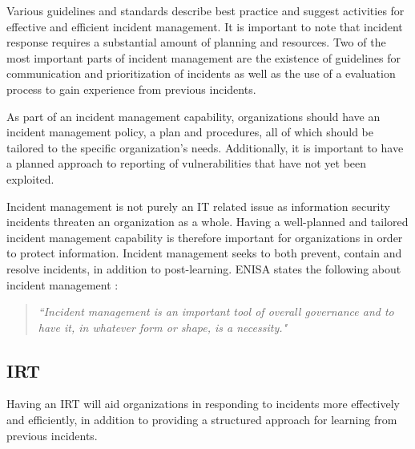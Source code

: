 Various guidelines and standards describe best practice and suggest activities for effective and efficient incident management. It is important to note that incident response requires a substantial amount of planning and resources. Two of the most important parts of incident management are the existence of guidelines for communication and prioritization of incidents as well as the use of a evaluation process to gain experience from previous incidents. \cite{nist800-61}

As part of an incident management capability, organizations should have an incident management policy, a plan and procedures, all of which should be tailored to the specific organization's needs. Additionally, it is important to have a planned approach to reporting of vulnerabilities that have not yet been exploited. \cite{ISO/IEC27035}



Incident management is not purely an IT related issue as information security incidents threaten an organization as a whole. Having a well-planned and tailored incident management capability is therefore important for organizations in order to protect information. Incident management seeks to both prevent, contain and resolve incidents, in addition to post-learning. ENISA states the following about incident management \cite{enisaGuide}: 

\begin{quote}
\textit{``Incident management is an important tool of overall governance and to have it, in whatever form or shape, is a necessity."}
\end{quote}

\subsection{\acl{IRT}}
Having an \ac{IRT} will aid organizations in responding to incidents more effectively and efficiently, in addition to providing a structured approach for learning from previous incidents. 

